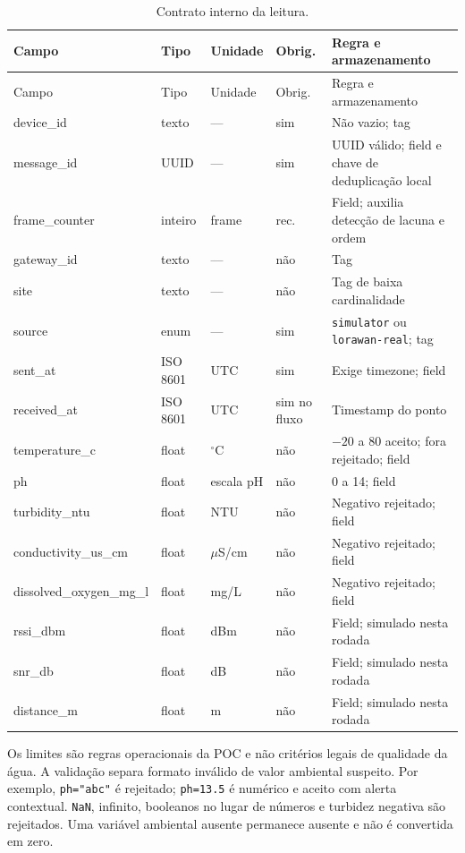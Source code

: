 \documentclass[12pt,a4paper]{article}
\newcommand{\code}[1]{\texttt{#1}}
\begin{document}
\small
\begin{longtable}{>{\ttfamily\raggedright\arraybackslash}p{3.25cm} p{2.0cm} p{1.4cm} p{1.25cm} p{4.2cm}}
\caption{Contrato interno da leitura.}\\
\toprule
\normalfont Campo & Tipo & Unidade & Obrig. & Regra e armazenamento \\
\midrule
\endfirsthead
\toprule
\normalfont Campo & Tipo & Unidade & Obrig. & Regra e armazenamento \\
\midrule
\endhead
device\_id & texto & --- & sim & Não vazio; tag \\
message\_id & UUID & --- & sim & UUID válido; field e chave de deduplicação local \\
frame\_counter & inteiro & frame & rec. & Field; auxilia detecção de lacuna e ordem \\
gateway\_id & texto & --- & não & Tag \\
site & texto & --- & não & Tag de baixa cardinalidade \\
source & enum & --- & sim & \code{simulator} ou \code{lorawan-real}; tag \\
sent\_at & ISO 8601 & UTC & sim & Exige timezone; field \\
received\_at & ISO 8601 & UTC & sim no fluxo & Timestamp do ponto \\
temperature\_c & float & $^{\circ}$C & não & $-20$ a 80 aceito; fora rejeitado; field \\
ph & float & escala pH & não & 0 a 14; field \\
turbidity\_ntu & float & NTU & não & Negativo rejeitado; field \\
conductivity\_\allowbreak us\_cm & float & $\mu$S/cm & não & Negativo rejeitado; field \\
dissolved\_\allowbreak oxygen\_\allowbreak mg\_l & float & mg/L & não & Negativo rejeitado; field \\
rssi\_dbm & float & dBm & não & Field; simulado nesta rodada \\
snr\_db & float & dB & não & Field; simulado nesta rodada \\
distance\_m & float & m & não & Field; simulado nesta rodada \\
\bottomrule
\end{longtable}
\normalsize

Os limites são regras operacionais da POC e não critérios legais de qualidade da água. A validação separa formato inválido de valor ambiental suspeito. Por exemplo, \code{ph="abc"} é rejeitado; \code{ph=13.5} é numérico e aceito com alerta contextual. \code{NaN}, infinito, booleanos no lugar de números e turbidez negativa são rejeitados. Uma variável ambiental ausente permanece ausente e não é convertida em zero.
\end{document}
